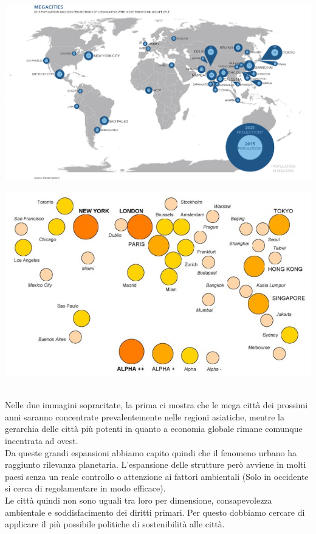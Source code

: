 \documentclass[a4paper,12pt, oneside]{book}
\begin{document}
    \begin{center}
    	\begin{minipage}{0.48\linewidth}
    		\includegraphics[width=\linewidth]{"Immagini/Megacities"}
    		\label{fig:megacities}
    	\end{minipage}%
    	\hfill
    	\begin{minipage}{0.46\linewidth}
    		\includegraphics[width=\linewidth]{"Immagini/alpha2004c"}
    		\label{fig:alphacities}
    	\end{minipage}
    \end{center}
    \leavevmode\\
    Nelle due immagini sopracitate, la prima ci mostra che le mega città dei prossimi anni saranno concentrate prevalentemente nelle regioni asiatiche, mentre la gerarchia delle città più potenti in quanto a economia globale rimane comunque incentrata ad ovest.\\
    Da queste grandi espansioni abbiamo capito quindi che il fenomeno urbano ha raggiunto rilevanza planetaria. L'espansione delle strutture però avviene in molti paesi senza un reale controllo o attenzione ai fattori ambientali (Solo in occidente si cerca di regolamentare in modo efficace).\\
    Le città quindi non sono uguali tra loro per dimensione, consapevolezza ambientale e soddisfacimento dei diritti primari. Per questo dobbiamo cercare di applicare il più possibile politiche di sostenibilità alle città.\\
\end{document}
